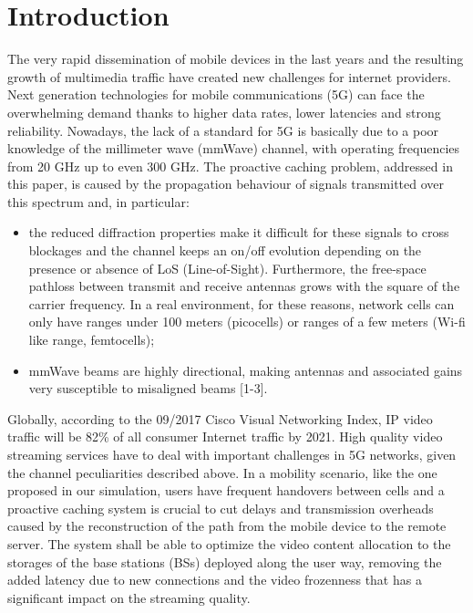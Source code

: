 \documentclass[conference,10pt]{IEEEtran}
\begin{document}
\section{Introduction}\label{sec:intro}
The very rapid dissemination of mobile devices in the last years and the resulting growth of multimedia traffic have created new challenges for internet providers. Next generation technologies for mobile communications (5G) can face the overwhelming demand thanks to higher data rates, lower latencies and strong reliability. Nowadays, the lack of a standard for 5G is basically due to a poor knowledge of the millimeter wave (mmWave) channel, with operating frequencies from  20 GHz up to even 300 GHz. The proactive caching problem, addressed in this paper, is caused by the propagation behaviour of signals transmitted over this spectrum and, in particular:
\begin{itemize}
\item the reduced diffraction properties make it difficult for these signals to cross blockages and the channel keeps an on/off evolution depending on the presence or absence of LoS (Line-of-Sight). Furthermore, the free-space pathloss between transmit and receive antennas grows with the square of the carrier frequency.  In a real environment, for these reasons, network cells can only have ranges under 100 meters (picocells) or ranges of a few meters (Wi-fi like range, femtocells);
\item mmWave beams are highly directional, making antennas and associated gains very susceptible to misaligned beams [1-3].
\end{itemize}
Globally, according to the 09/2017 Cisco Visual Networking Index, IP video traffic will be 82\% of all consumer Internet traffic by 2021. High quality video streaming services have to deal with important challenges in 5G networks, given the channel peculiarities described above. In a mobility scenario, like the one proposed in our simulation, users have frequent handovers between cells and a proactive caching system is crucial to cut delays and transmission overheads caused by the reconstruction of the path from the mobile device to the remote server. The system shall be able to optimize the video content allocation to the storages of the base stations (BSs) deployed along the user way, removing the added latency due to new connections and the video frozenness that has a significant impact on the streaming quality.
\end{document}
